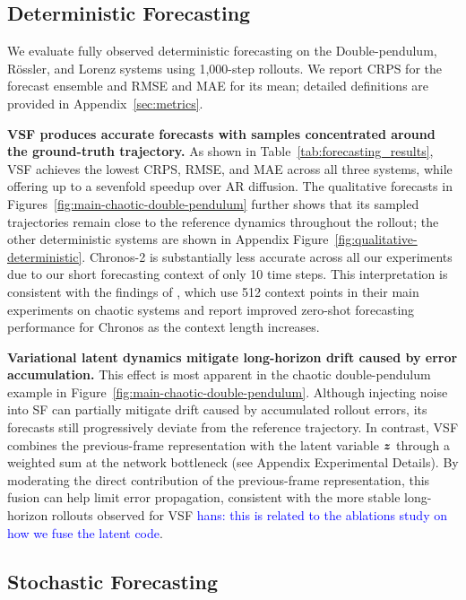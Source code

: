 \documentclass{article} %
\numberwithin{equation}{section}
\newcommand{\hans}[1]{\textcolor{blue}{hans: #1}}
\begin{document}
\subsection{Deterministic Forecasting} \label{sec:exp-deterministic}

We evaluate fully observed deterministic forecasting on the Double-pendulum,
R\"ossler, and Lorenz systems using 1,000-step rollouts. We report CRPS for the
forecast ensemble and RMSE and MAE for its mean; detailed definitions are
provided in Appendix~\ref{sec:metrics}.

\textbf{VSF produces accurate forecasts with samples concentrated around the ground-truth trajectory.} As shown in Table~\ref{tab:forecasting_results}, VSF achieves the lowest CRPS, RMSE, and MAE across all three systems, while offering
up to a sevenfold speedup over AR diffusion. The qualitative forecasts in
Figures~\ref{fig:main-chaotic-double-pendulum}
further shows that its sampled
trajectories remain close to the reference dynamics throughout the rollout;
the other deterministic systems are shown in Appendix
Figure~\ref{fig:qualitative-deterministic}.
Chronos-2 is substantially less accurate across all our experiments due to our short forecasting context of only 10 time
steps. This interpretation is consistent with the findings of
\citet{zhang2025zero}, which use 512 context points in their main experiments
on chaotic systems and report improved zero-shot forecasting performance
for Chronos as the context length increases.


\textbf{Variational latent dynamics mitigate long-horizon drift caused by
error accumulation.} 
This effect is most apparent in the chaotic double-pendulum example in Figure~\ref{fig:main-chaotic-double-pendulum}. Although injecting noise into SF can partially mitigate drift caused by accumulated rollout errors, its forecasts still progressively deviate from the reference trajectory. In contrast, VSF combines the previous-frame representation with the latent variable ${\bm{z}}$ through a weighted sum at the network bottleneck (see Appendix Experimental Details). By moderating the direct contribution of the previous-frame representation, this fusion can help limit error propagation, consistent with the more stable long-horizon rollouts observed for VSF \hans{this is related to the ablations study on how we fuse the latent code}.

\subsection{Stochastic Forecasting} \label{sec:exp-stochatic}
\end{document}

